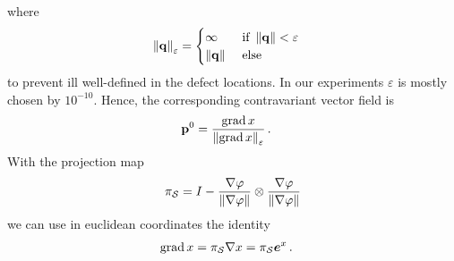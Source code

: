 \documentclass[a4paper,11pt]{scrartcl}
\newcommand{\EuBase}[1]{\eb^{#1}}
\begin{document}
where
\begin{align}
  \left\| \mathbf{q} \right\|_{\varepsilon} &=
      \begin{cases}
        \infty & \text{ if } \left\| \mathbf{q} \right\| < \varepsilon \\
        \left\| \mathbf{q} \right\| & \text{ else}
      \end{cases}
\end{align}
to prevent ill well-defined in the defect locations. 
In our experiments \( \varepsilon \) is mostly chosen by \( 10^{-10} \).
Hence, the corresponding contravariant vector field is
\begin{align}
  \mathbf{p}^{0} &= \frac{\operatorname{grad} x}{\left\| \operatorname{grad} x \right\|_{\varepsilon}}\,\text{.}
\end{align}
With the projection map
\begin{align}
  \pi_{\mathcal{S}} = I - \frac{\nabla\varphi}{\left\| \nabla\varphi \right\|} \otimes \frac{\nabla\varphi}{\left\| \nabla\varphi \right\|}
\end{align}
we can use in euclidean coordinates the identity
\begin{align}
  \Grad x &= \ProjectSurf\nabla x = \ProjectSurf\EuBase{x} \formPeriod
\end{align}
\end{document}
